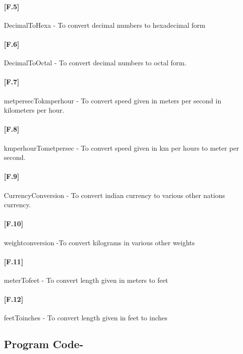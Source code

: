 \documentclass[12pt,a4paper]{article}
\begin{document}
\paragraph{[F.5]}DecimalToHexa - To convert decimal numbers to hexadecimal form
\\
\paragraph{[F.6]}DecimalToOctal - To convert decimal numbers to octal form.
\\
\paragraph{[F.7]}metpersecTokmperhour - To convert speed given in meters per second
in kilometers per hour.
\\
\paragraph{[F.8]}kmperhourTometpersec - To convert speed given in km per hours to meter per second.
\\
\paragraph{[F.9]}CurrencyConversion - To convert indian currency to various other nations currency.
\\
\paragraph{[F.10]}weightconversion -To convert kilograms in various other weights
\\
\paragraph{[F.11]}meterTofeet - To convert length given in meters to feet
\\
\paragraph{[F.12]}feetToinches - To convert length given in feet to inches
\\

\pagebreak

\subsection{Program Code-}
\end{document}
